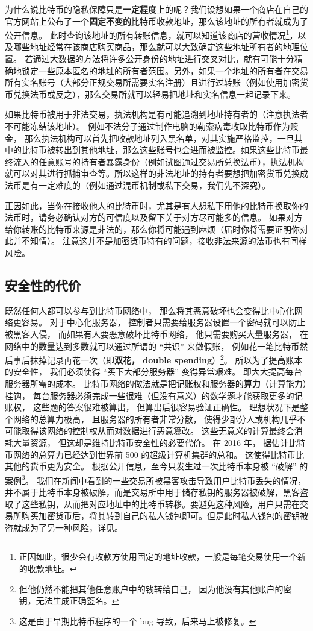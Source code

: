 为什么说比特币的隐私保障只是\textbf{一定程度}上的呢？我们设想如果一个商店在自己的官方网站上公布了一个\textbf{固定不变的}比特币收款地址，那么该地址的所有者就成为了公开信息。 此时查询该地址的所有转账信息，就可以知道该商店的营收情况\footnote{正因如此，很少会有收款方使用固定的地址收款，一般是每笔交易使用一个新的收款地址。}，以及哪些地址经常在该商店购买商品，那么就可以大致确定这些地址所有者的地理位置。 若通过大数据的方法将许多公开身份的地址进行交叉对比，就有可能十分精确地锁定一些原本匿名的地址的所有者范围。另外，如果一个地址的所有者在交易所有实名账号（大部分正规交易所需要实名注册）且进行过转账（例如使用加密货币兑换法币或反之），那么交易所就可以轻易把地址和实名信息一起记录下来。

如果比特币被用于非法交易，执法机构是有可能追溯到地址持有者的（注意执法者不可能冻结该地址）。 例如不法分子通过制作电脑的勒索病毒收取比特币作为赎金， 那么执法机构可以首先把收款地址列入黑名单，对其实施严格监控，一旦其中的比特币被转出到其他地址，那么这些账号也会进而被监控。如果这些比特币最终流入的任意账号的持有者暴露身份（例如试图通过交易所兑换法币），执法机构就可以对其进行抓捕审查等。所以这样的非法地址的持有者要想把加密货币兑换成法币是有一定难度的（例如通过混币机制或私下交易，我们先不深究）。

正因如此，当你在接收他人的比特币时，尤其是有人想私下用他的比特币换取你的法币时，请务必确认对方的可信度以及留下关于对方尽可能多的信息。 如果对方给你转账的比特币来源是非法的，那么你将可能遇到麻烦（届时你将需要证明你对此并不知情）。 注意这并不是加密货币特有的问题，接收非法来源的法币也有同样风险。

\subsection{安全性的代价}
既然任何人都可以参与到比特币网络中， 那么将其恶意破坏也会变得比中心化网络更容易。 对于中心化服务器， 控制者只需要给服务器设置一个密码就可以防止被黑客入侵， 而如果有人要恶意破坏比特币网络， 他只需要购买大量服务器， 在网络中的数量达到多数就可以通过所谓的 “共识” 来做假账， 例如花一笔比特币然后事后抹掉记录再花一次（即\textbf{双花， double spending}）\footnote{但他仍然不能把其他任意账户中的钱转给自己， 因为他没有其他账户的密钥，无法生成正确签名。}。 所以为了提高账本的安全性， 我们必须使得 “买下大部分服务器” 变得异常艰难。 即大大提高每台服务器所需的成本。 比特币网络的做法就是把记账权和服务器的\textbf{算力}（计算能力）挂钩， 每台服务器必须完成一些很难（但没有意义）的数学题才能获取更多的记账权， 这些题的答案很难被算出， 但算出后很容易验证正确性。 理想状况下是整个网络的总算力极高， 且服务器的所有者非常分散， 使得少部分人或机构几乎不可能取得该网络的控制权从而对数据进行恶意篡改。 这些无意义的计算最终会消耗大量资源， 但这却是维持比特币安全性的必要代价。 在 2016 年， 据估计比特币网络的总算力已经达到世界前 500 的超级计算机集群的总和。 这使得比特币比其他的货币更为安全。 根据公开信息，至今只发生过一次比特币本身被 “破解” 的案例\footnote{这是由于早期比特币程序的一个 bug 导致，后来马上被修复。}。 我们在新闻中看到的一些交易所被黑客攻击导致用户比特币丢失的情况，并不属于比特币本身被破解，而是交易所中用于储存私钥的服务器被破解，黑客盗取了这些私钥，从而把对应地址中的比特币转移。要避免这种风险，用户只需在交易所购买加密货币后，将其转到自己的私人钱包即可。但是此时私人钱包的密钥被盗就成为了另一种风险，详见。


